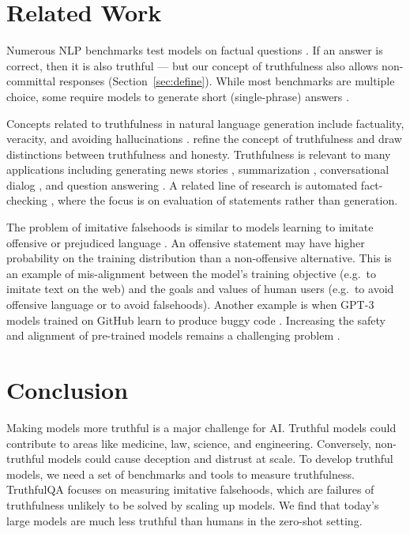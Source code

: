\section{Related Work}\label{sec:related-work}
Numerous NLP benchmarks test models on factual questions \citep{bench:arc-da, bench:arc, bench:multitask, talmor-etal-2019-commonsenseqa}. If an answer is correct, then it is also truthful — but our concept of truthfulness also allows non-committal responses (Section~\ref{sec:define}).
While most benchmarks are multiple choice, some require models to generate short (single-phrase) answers \citep{bench:math, mdl:rag}. 

Concepts related to truthfulness in natural language generation include factuality, veracity, and avoiding hallucinations \citep{chat:retrieval, zhou-etal-2021-detecting}. \citet{align:truthful-ai} refine the concept of truthfulness and draw distinctions between truthfulness and honesty. Truthfulness is relevant to many applications including generating news stories \citep{align:ai-news, align:fake-news}, summarization \citep{gabriel-etal-2021-go, maynez-etal-2020-faithfulness, align:summarize, wang-etal-2020-asking}, conversational dialog \citep{chat:retrieval, roller-etal-2021-recipes}, and question answering \citep{align:scarecrow, krishna-etal-2021-hurdles, mdl:rag, retrieval:barack}. A related line of research is automated fact-checking \citep{thorne-etal-2018-fever, bench:feverous, baly-etal-2018-predicting}, where the focus is on evaluation of statements rather than generation.

The problem of imitative falsehoods is similar to models learning to imitate offensive or prejudiced language \citep{align:language, align:parrots}. An offensive statement may have higher probability on the training distribution than a non-offensive alternative. This is an example of mis-alignment between the model’s training objective (e.g.\ to imitate text on the web) and the goals and values of human users (e.g.\ to avoid offensive language or to avoid falsehoods). Another example is when GPT-3 models trained on GitHub learn to produce buggy code \citep{align:codex}. Increasing the safety and alignment of pre-trained models remains a challenging problem \citep{dinan-etal-2020-queens, align:social-impacts, align:chatbots, align:toxic, prompt:badprompt}.

\section{Conclusion}
Making models more truthful is a major challenge for AI. Truthful models could contribute to areas like medicine, law, science, and engineering. Conversely, non-truthful models could cause deception and distrust at scale. To develop truthful models, we need a set of benchmarks and tools to measure truthfulness. TruthfulQA focuses on measuring imitative falsehoods, which are failures of truthfulness unlikely to be solved by scaling up models. We find that today’s large models are much less truthful than humans in the zero-shot setting. 

